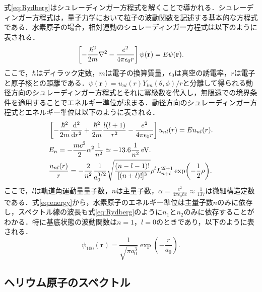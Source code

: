 \documentclass[a4paper,dvipdfmx,10.5pt]{jarticle}
\begin{document}
式\eqref{eq:Rydberg}はシュレーディンガー方程式を解くことで導かれる．シュレーディンガー方程式は，量子力学において粒子の波動関数を記述する基本的な方程式である．水素原子の場合，相対運動のシュレーディンガー方程式は以下のように表される．
\begin{equation}
  \left[-\frac{\hbar^2}{2m} \laplacian  - \frac{e^2}{4\pi \epsilon_0 r} \right] \psi(\mathbf{r}) = E \psi(\mathbf{r}).\label{eq:Schrodinger}
\end{equation}
ここで，$\hbar$はディラック定数，$m$は電子の換算質量，$\epsilon_0$は真空の誘電率，$r$は電子と原子核との距離である．$\psi(\mathbf{r})=u_{nl}(r) Y_{lm}(\theta, \phi)/r$と分離して得られる動径方向のシュレーディンガー方程式とそれに冪級数を代入し，無限遠での境界条件を適用することでエネルギー準位が求まる．動径方向のシュレーディンガー方程式とエネルギー準位は以下のように表される．
\begin{align}
  &\left[-\frac{\hbar^2}{2m} \dv[2]{r} + \frac{\hbar^2}{2m}\frac{ l(l+1)}{r^2} - \frac{e^2}{4\pi \epsilon_0 r} \right] u_{nl}(r) = E u_{nl}(r).\label{eq:radial}\\
  &E_n = - \frac{mc^2}{2}\alpha^2\frac{1}{n^2}\simeq -13.6\frac{1}{n^2} \, \text{eV}.\label{eq:energy}\\
  &\frac{u_{nl}(r)}{r}= -\frac{2}{n^2}\frac{1}{a_0^{3/2}}\sqrt{\frac{(n-l-1)!}{[(n+l)!]^3}}\rho^l L_{n+l}^{2l+1}\exp(-\frac{1}{2}\rho).\label{eq:radial_solution}
\end{align}
ここで，$l$は軌道角運動量量子数，$n$は主量子数，$\alpha= \frac{e^2}{4\pi \epsilon_0 \hbar c} \approx \frac{1}{137}$は微細構造定数である．式\eqref{eq:energy}から，水素原子のエネルギー準位は主量子数$n$のみに依存し，スペクトル線の波長も式\eqref{eq:Rydberg}のように$n_1$と$n_2$のみに依存することがわかる．特に基底状態の波動関数は$n=1$，$l=0$のときであり，以下のように表される．
\begin{equation}
  \psi_{100}(\mathbf{r}) = \frac{1}{\sqrt{\pi a_0^3}} \exp(-\frac{r}{a_0}).\label{eq:ground_state}
\end{equation}
\subsection{ヘリウム原子のスペクトル}
\end{document}
